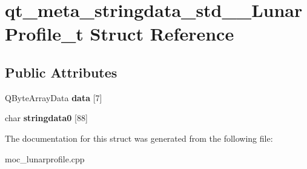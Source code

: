 \hypertarget{structqt__meta__stringdata__std____LunarProfile__t}{}\section{qt\+\_\+meta\+\_\+stringdata\+\_\+std\+\_\+\+\_\+\+Lunar\+Profile\+\_\+t Struct Reference}
\label{structqt__meta__stringdata__std____LunarProfile__t}
\subsection*{Public Attributes}
\begin{DoxyCompactItemize}
\item 
\mbox{\label{structqt__meta__stringdata__std____LunarProfile__t_a39c7802748ae6ec6b7568cc7d3ee03dd}} 
Q\+Byte\+Array\+Data {\bfseries data} \mbox{[}7\mbox{]}
\item 
\mbox{\label{structqt__meta__stringdata__std____LunarProfile__t_a692f875114455ff5c346d762c2dcad48}} 
char {\bfseries stringdata0} \mbox{[}88\mbox{]}
\end{DoxyCompactItemize}


The documentation for this struct was generated from the following file\+:\begin{DoxyCompactItemize}
\item 
moc\+\_\+lunarprofile.\+cpp\end{DoxyCompactItemize}
